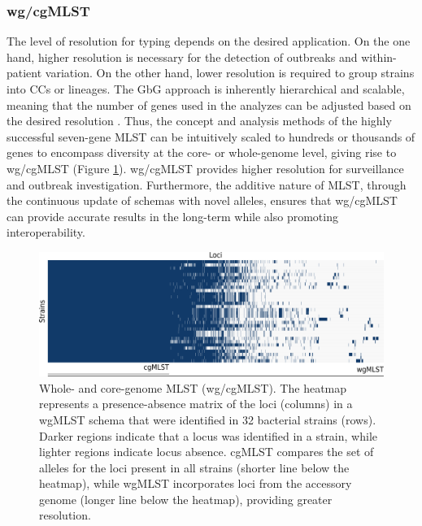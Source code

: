 \subsubsection{wg/cgMLST}

The level of resolution for typing depends on the desired application. On the one hand, higher resolution is necessary for the detection of outbreaks and within-patient variation. On the other hand, lower resolution is required to group strains into \acs{CC}s or lineages. The \ac{GbG} approach is inherently hierarchical and scalable, meaning that the number of genes used in the analyzes can be adjusted based on the desired resolution \cite{maiden_mlst_2013}. Thus, the concept and analysis methods of the highly successful seven-gene \ac{MLST} can be intuitively scaled to hundreds or thousands of genes to encompass diversity at the core- or whole-genome level, giving rise to \ac{wg/cgMLST} (Figure \ref{fig:introduction_figure8}). \ac{wg/cgMLST} provides higher resolution for surveillance and outbreak investigation. Furthermore, the additive nature of \ac{MLST}, through the continuous update of schemas with novel alleles, ensures that \ac{wg/cgMLST} can provide accurate results in the long-term while also promoting interoperability.

\begin{figure}[h!]
    \centering
    \includegraphics[angle=0,width=\textwidth]{figures/introduction/Figure8.pdf}
    \caption[Whole- and core-genome MLST]{Whole- and core-genome \ac{MLST} (\ac{wg/cgMLST}). The heatmap represents a presence-absence matrix of the loci (columns) in a wgMLST schema that were identified in 32 bacterial strains (rows). Darker regions indicate that a locus was identified in a strain, while lighter regions indicate locus absence. \ac{cgMLST} compares the set of alleles for the loci present in all strains (shorter line below the heatmap), while \ac{wgMLST} incorporates loci from the accessory genome (longer line below the heatmap), providing greater resolution.}
    \label{fig:introduction_figure8}
\end{figure}

